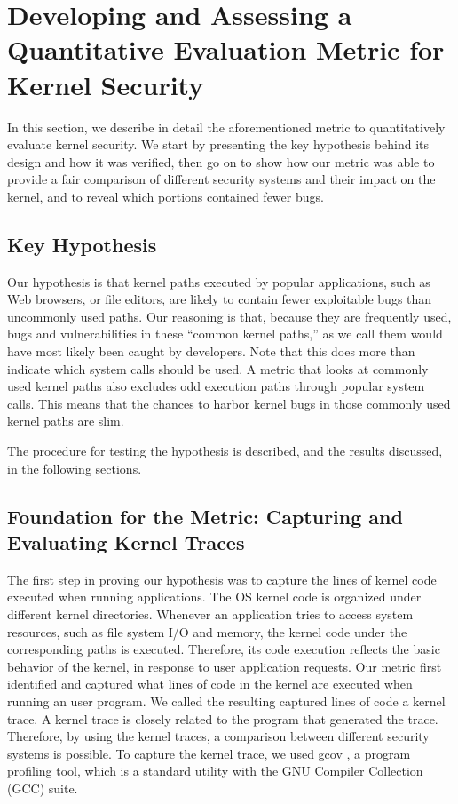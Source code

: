 \section{Developing and Assessing a Quantitative Evaluation Metric for Kernel Security}
\label{sec.metric}

In this section, we describe in detail the aforementioned metric to 
quantitatively evaluate kernel security. We start by presenting 
the key hypothesis behind its design and how it was verified, 
then go on to show how our metric was able to provide a fair comparison of 
different security systems and their impact on the kernel, 
and to reveal which portions contained fewer bugs.

\subsection{Key Hypothesis}

Our hypothesis is that kernel paths executed by popular applications, 
such as Web browsers, or file editors, are likely to contain fewer exploitable bugs 
than uncommonly used paths. Our reasoning is that, because they are frequently used, 
bugs and vulnerabilities in these ``common kernel paths,'' as we call them 
would have most likely been caught by developers. 
Note that this does more than indicate which system calls should be used. 
A metric that looks at commonly used kernel paths also excludes odd execution paths 
through popular system calls. 
This means that the chances to harbor kernel bugs in those commonly used kernel paths are slim. 

The procedure for testing the hypothesis is described, and the results discussed, in the following sections. 

\subsection{Foundation for the Metric: Capturing and Evaluating Kernel Traces}

The first step in proving our hypothesis was to capture the lines of kernel code executed 
when running applications. The OS kernel code is organized under different kernel directories. 
Whenever an application tries to access system resources, such as file system I/O and memory, 
the kernel code under the corresponding paths is executed. Therefore, 
its code execution reflects the basic behavior of the kernel, in response to user application requests. 
Our metric first identified and captured what lines of code in the kernel are executed 
when running an user program. We called the resulting captured lines of code a kernel trace. 
A kernel trace is closely related to the program that generated the trace. 
Therefore, by using the kernel traces, a comparison between different security systems is possible. 
To capture the kernel trace, we used gcov \cite{gcov}, a program profiling tool, 
which  is a standard utility with the GNU Compiler Collection (GCC) suite. 

